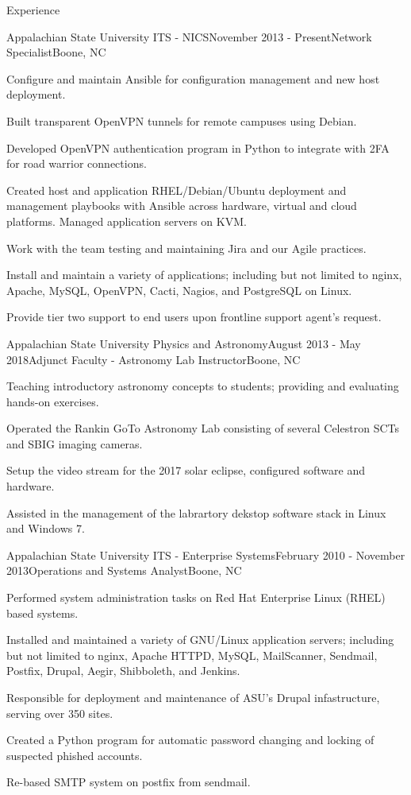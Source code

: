 \documentclass{cv} %
\begin{document}
\begin{rSection}{Experience}

\begin{rSubsection}{Appalachian State University ITS - NICS}{November 2013 - Present}{Network Specialist}{Boone, NC}
\item Configure and maintain Ansible for configuration management and new host deployment.
\item Built transparent OpenVPN tunnels for remote campuses using Debian.
\item Developed OpenVPN authentication program in Python to integrate with 2FA for road warrior connections.
\item Created host and application RHEL/Debian/Ubuntu deployment and management playbooks with Ansible across hardware, virtual and cloud platforms. Managed application servers on KVM.
\item Work with the team testing and maintaining Jira and our Agile practices.
\item Install and maintain a variety of applications; including but not limited to nginx, Apache, MySQL, OpenVPN, Cacti, Nagios, and PostgreSQL on Linux.
\item Provide tier two support to end users upon frontline support agent's request.

\end{rSubsection}

\begin{rSubsection}{Appalachian State University Physics and Astronomy}{August 2013 - May 2018}{Adjunct Faculty - Astronomy Lab Instructor}{Boone, NC}
\item Teaching introductory astronomy concepts to students; providing and evaluating hands-on exercises.
\item Operated the Rankin GoTo Astronomy Lab consisting of several Celestron SCTs and SBIG imaging cameras.
\item Setup the video stream for the 2017 solar eclipse, configured software and hardware.
\item Assisted in the management of the labrartory dekstop software stack in Linux and Windows 7.
\end{rSubsection}

\begin{rSubsection}{Appalachian State University ITS - Enterprise Systems}{February 2010 - November 2013}{Operations and Systems Analyst}{Boone, NC}
\item Performed system administration tasks on Red Hat Enterprise Linux (RHEL) based systems.
\item Installed and maintained a variety of GNU/Linux application servers; including but not limited to nginx, Apache HTTPD, MySQL, MailScanner, Sendmail, Postfix, Drupal, Aegir, Shibboleth, and Jenkins.
\item Responsible for deployment and maintenance of ASU's Drupal infastructure, serving over 350 sites.
\item Created a Python program for automatic password changing and locking of suspected phished accounts.
\item Re-based SMTP system on postfix from sendmail. 
\end{rSubsection}


\end{rSection}
\end{document}
